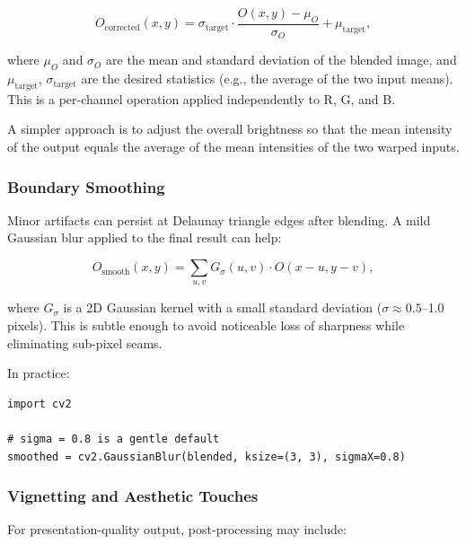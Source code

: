 \begin{equation}
    O_{\text{corrected}}(x, y) = \sigma_{\text{target}}
        \cdot \frac{O(x, y) - \mu_O}{\sigma_O} + \mu_{\text{target}},
\end{equation}

where $\mu_O$ and $\sigma_O$ are the mean and standard deviation of the blended image, and
$\mu_{\text{target}}$, $\sigma_{\text{target}}$ are the desired statistics (e.g., the average
of the two input means). This is a per-channel operation applied independently to R, G, and B.

A simpler approach is to adjust the overall brightness so that the mean intensity of the output
equals the average of the mean intensities of the two warped inputs.

\subsubsection{Boundary Smoothing}

Minor artifacts can persist at Delaunay triangle edges after blending. A mild Gaussian blur
applied to the final result can help:

\begin{equation}
    O_{\text{smooth}}(x, y) = \sum_{u, v} G_\sigma(u, v) \cdot O(x - u, y - v),
\end{equation}

where $G_\sigma$ is a 2D Gaussian kernel with a small standard deviation
($\sigma \approx 0.5$--1.0 pixels). This is subtle enough to avoid noticeable loss of sharpness
while eliminating sub-pixel seams.

In practice:

\begin{verbatim}
import cv2

# sigma = 0.8 is a gentle default
smoothed = cv2.GaussianBlur(blended, ksize=(3, 3), sigmaX=0.8)
\end{verbatim}

\subsubsection{Vignetting and Aesthetic Touches}

For presentation-quality output, post-processing may include:

